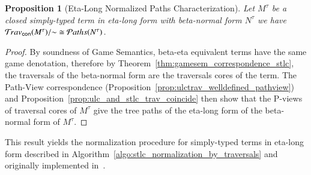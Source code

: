 \documentclass{elsarticle}
\theoremstyle{plain}
\newtheorem{proposition}[theorem]{Proposition}
\theoremstyle{definition}
\newcommand{\concrete}{{\sf con}}
\newcommand{\travsetcon}{{\travset_\concrete}} %
\def\structisomorphic{\cong} %
\newcommand\pathset{{\mathcal{P}aths}} %
\begin{document}


\begin{proposition}[Eta-Long Normalized Paths Characterization]
\label{prop:path_charact_stlc}
Let $M^\tau$ be a closed simply-typed term
in eta-long form with beta-normal form $N^\tau$
we have $\travsetcon(M^\tau)/{\sim} \structisomorphic \pathset(N^\tau)$.
\end{proposition}
\begin{proof}
 By soundness of Game Semantics, beta-eta equivalent terms have the same game denotation, therefore by Theorem~\ref{thm:gamesem_correspondence_stlc}, the traversals of the beta-normal form are the traversals cores of the term. The Path-View correspondence (Proposition~\ref{prop:ulctrav_welldefined_pathview}) and Proposition~\ref{prop:ulc_and_stlc_trav_coincide} then show that the P-views of traversal cores of $M^\tau$ give the tree paths of the eta-long form of the beta-normal form of $M^\tau$.
\end{proof}

This result yields the normalization procedure for simply-typed terms in eta-long form described in Algorithm~\ref{algo:stlc_normalization_by_traversals} and originally implemented in~\cite{BlumGalop2008, Blum-HogTool}.
\end{document}
